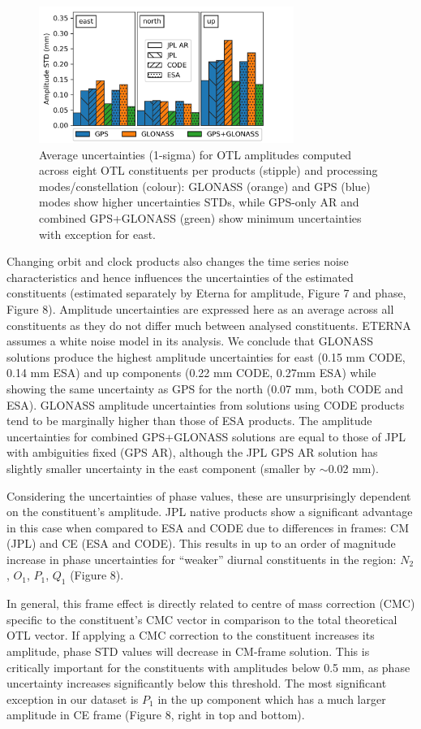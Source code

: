 \documentclass[se, manuscript]{copernicus}
\begin{document}
\begin{figure}[t]
\includegraphics[width=8.3cm]{fig07.png}
\caption{Average uncertainties (1-sigma) for OTL amplitudes computed across eight OTL constituents per products (stipple) and processing modes/constellation (colour): GLONASS (orange) and GPS (blue) modes show higher uncertainties STDs, while GPS-only AR and combined GPS+GLONASS (green) show minimum uncertainties with exception for east.}
\end{figure}

Changing orbit and clock products also changes the time series noise characteristics and hence influences the uncertainties of the estimated constituents (estimated separately by Eterna for amplitude, Figure 7 and phase, Figure 8). Amplitude uncertainties are expressed here as an average across all constituents as they do not differ much between analysed constituents. ETERNA assumes a white noise model in its analysis. We conclude that GLONASS solutions produce the highest amplitude uncertainties for east (0.15 mm CODE, 0.14 mm ESA) and up components (0.22 mm CODE, 0.27mm ESA) while showing the same uncertainty as GPS for the north (0.07 mm, both CODE and ESA). GLONASS amplitude uncertainties from solutions using CODE products tend to be marginally higher than those of ESA products. The amplitude uncertainties for combined GPS+GLONASS solutions are equal to those of JPL with ambiguities fixed (GPS AR), although the JPL GPS AR solution has slightly smaller uncertainty in the east component (smaller by $\sim$0.02 mm).


Considering the uncertainties of phase values, these are unsurprisingly dependent on the constituent’s amplitude. JPL native products show a significant advantage in this case when compared to ESA and CODE due to differences in frames: CM (JPL) and CE (ESA and CODE). This results in up to an order of magnitude increase in phase uncertainties for “weaker” diurnal constituents in the region: $N_2$, $O_1$, $P_1$, $Q_1$ (Figure 8).

In general, this frame effect is directly related to centre of mass correction (CMC) specific to the constituent's CMC vector in comparison to the total theoretical OTL vector. If applying a CMC correction to the constituent increases its amplitude, phase STD values will decrease in CM-frame solution. This is critically important for the constituents with amplitudes below 0.5 mm, as phase uncertainty increases significantly below this threshold. The most significant exception in our dataset is $P_1$ in the up component which has a much larger amplitude in CE frame (Figure 8, right in top and bottom). 
\end{document}
